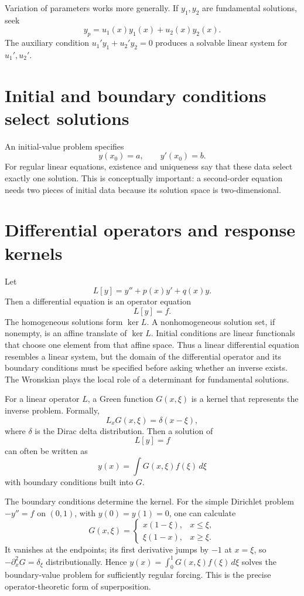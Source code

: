Variation of parameters works more generally.  If $y_1,y_2$ are fundamental solutions, seek
\[
  y_p=u_1(x)y_1(x)+u_2(x)y_2(x).
\]
The auxiliary condition $u_1'y_1+u_2'y_2=0$ produces a solvable linear system for $u_1',u_2'$.

\section{Initial and boundary conditions select solutions}

An initial-value problem specifies
\[
  y(x_0)=a,\qquad y'(x_0)=b.
\]
For regular linear equations, existence and uniqueness say that these data select exactly one solution.  This is conceptually important: a second-order equation needs two pieces of initial data because its solution space is two-dimensional.

\section{Differential operators and response kernels}

Let
\[
  L[y]=y''+p(x)y'+q(x)y.
\]
Then a differential equation is an operator equation
\[
  L[y]=f.
\]
The homogeneous solutions form $\ker L$.  A nonhomogeneous solution set, if nonempty, is an affine translate of $\ker L$.  Initial conditions are linear functionals that choose one element from that affine space. Thus a linear differential equation resembles a linear system, but the domain of the differential operator and its boundary conditions must be specified before asking whether an inverse exists. The Wronskian plays the local role of a determinant for fundamental solutions.

For a linear operator $L$, a Green function $G(x,\xi)$ is a kernel that represents the inverse problem.  Formally,
\[
  L_xG(x,\xi)=\delta(x-\xi),
\]
where $\delta$ is the Dirac delta distribution.  Then a solution of
\[
  L[y]=f
\]
can often be written as
\[
  y(x)=\int G(x,\xi)f(\xi)\,d\xi
\]
with boundary conditions built into $G$.

The boundary conditions determine the kernel. For the simple Dirichlet problem \(-y''=f\) on \((0,1)\), with \(y(0)=y(1)=0\), one can calculate
\[
 G(x,\xi)=\begin{cases}x(1-\xi),&x\le\xi,\\
 \xi(1-x),&x\ge\xi.
 \end{cases}
\]
It vanishes at the endpoints; its first derivative jumps by \(-1\) at \(x=\xi\), so \(-\partial_x^2G=\delta_\xi\) distributionally. Hence \(y(x)=\int_0^1G(x,\xi)f(\xi)\,d\xi\) solves the boundary-value problem for sufficiently regular forcing. This is the precise operator-theoretic form of superposition.


